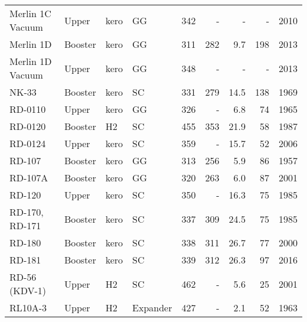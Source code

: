 \begin{tabular}{llllrrrrr}
Merlin 1C Vacuum  &    Upper &  kero &        GG &       342 &      - &              - &                 - &                 2010 \\
Merlin 1D         &  Booster &  kero &        GG &       311 &      282 &              9.7 &                 198 &                 2013 \\
Merlin 1D Vacuum  &    Upper &  kero &        GG &       348 &      - &              - &                 - &                 2013 \\
NK-33             &  Booster &  kero &        SC &       331 &      279 &             14.5 &                 138 &                 1969 \\
RD-0110           &    Upper &  kero &        GG &       326 &      - &              6.8 &                  74 &                 1965 \\
RD-0120           &  Booster &    H2 &        SC &       455 &      353 &             21.9 &                  58 &                 1987 \\
RD-0124           &    Upper &  kero &        SC &       359 &      - &             15.7 &                  52 &                 2006 \\
RD-107            &  Booster &  kero &        GG &       313 &      256 &              5.9 &                  86 &                 1957 \\
RD-107A           &  Booster &  kero &        GG &       320 &      263 &              6.0 &                  87 &                 2001 \\
RD-120            &    Upper &  kero &        SC &       350 &      - &             16.3 &                  75 &                 1985 \\
RD-170, RD-171    &  Booster &  kero &        SC &       337 &      309 &             24.5 &                  75 &                 1985 \\
RD-180            &  Booster &  kero &        SC &       338 &      311 &             26.7 &                  77 &                 2000 \\
RD-181            &  Booster &  kero &        SC &       339 &      312 &             26.3 &                  97 &                 2016 \\
RD-56 (KDV-1)     &    Upper &    H2 &        SC &       462 &      - &              5.6 &                  25 &                 2001 \\
RL10A-3           &    Upper &    H2 &  Expander &       427 &      - &              2.1 &                  52 &                 1963 \\

\end{tabular}

